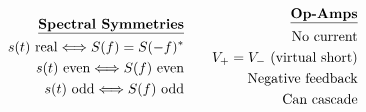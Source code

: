 \documentclass[11pt]{article}
\begin{document}
\begin{eqnarray*}
\begin{split}
\mbox{{\bf \underline{Spectral Symmetries}}}\\
s(t)\mbox{ real} \Longleftrightarrow S(f) = S(-f)^{*} \\
s(t) \mbox{ even} \Longleftrightarrow S(f)  \mbox{ even} \\
s(t) \mbox{ odd} \Longleftrightarrow S(f) \mbox{ odd} \\
\end{split}
\qquad
\begin{split}
\mbox{{\bf \underline{Op-Amps}}}\\
\mbox{No current}\\
V_+ = V_- \mbox{ (virtual short)}\\
\mbox{Negative feedback}\\
\mbox{Can cascade}\\
\end{split}
\end{eqnarray*}
\end{document}
